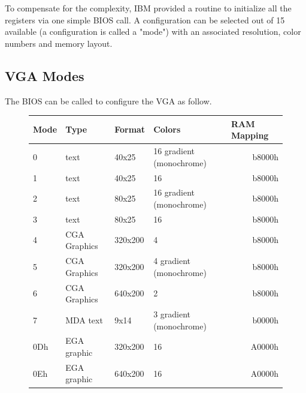 \documentclass[book.tex]{subfiles}
\begin{document}
\bigskip



To compensate for the complexity, IBM provided a routine to initialize all the registers via one simple BIOS call. A configuration can be selected out of 15 available (a configuration is called a "mode") with an associated resolution, color numbers and memory layout.

\subsection{VGA Modes}

The BIOS can be called to configure the VGA as follow.

\begin{figure}[H]
\centering
\begin{table}[H]
\begin{tabularx}{\textwidth}[c]{llllr}
\hline
\textbf{Mode} & \textbf{Type} & \textbf{Format} & \textbf{Colors}          & \multicolumn{1}{l}{\textbf{RAM Mapping}} \\ \hline
0             & text          & 40x25           & 16 gradient (monochrome) & b8000h                                \\ \hline
1             & text          & 40x25           & 16                       & b8000h                                \\ \hline
2             & text          & 80x25           & 16 gradient (monochrome) & b8000h                                \\ \hline
3             & text          & 80x25           & 16                       & b8000h                                \\ \hline
4             & CGA Graphics  & 320x200         & 4                        & b8000h                                \\ \hline
5             & CGA Graphics  & 320x200         & 4 gradient (monochrome)  & b8000h                                \\ \hline
6             & CGA Graphics  & 640x200         & 2                        & b8000h                                \\ \hline
7             & MDA text      & 9x14            & 3 gradient (monochrome)  & b0000h                                \\ \hline
0Dh           & EGA graphic   & 320x200         & 16                       & A0000h                                \\ \hline
0Eh           & EGA graphic   & 640x200         & 16                       & A0000h                                \\ \hline

\end{tabularx}
\end{table}
\end{figure}
\end{document}
